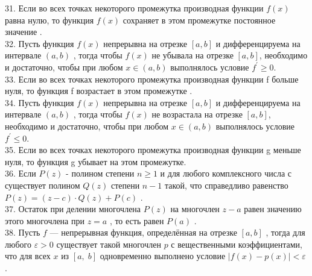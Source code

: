 \documentclass[12pt]{article}
\begin{document}
31. Если во всех точках некоторого промежутка производная функции ${\displaystyle f(x)}$ равна нулю, то функция ${\displaystyle f(x)}$ сохраняет в этом промежутке постоянное значение .\\

32. Пусть функция ${\displaystyle f(x)}$ непрерывна на отрезке  ${\displaystyle [a,b]}$ и дифференцируема на интервале ${\displaystyle (a,b)}$ ,  тогда чтобы ${\displaystyle f(x)}$ не убывала на отрезке ${\displaystyle [a,b]}$, необходимо и достаточно, чтобы при любом ${\displaystyle x \in (a,b)}$ выполнялось условие ${\displaystyle f^{\prime} \geq 0}$.\\

33. Если во всех точках некоторого промежутка производная функции f больше нуля, то функция f возрастает в этом промежутке .\\

34. Пусть функция ${\displaystyle f(x)}$ непрерывна на отрезке  ${\displaystyle [a,b]}$ и дифференцируема на интервале ${\displaystyle (a,b)}$ ,  тогда чтобы ${\displaystyle f(x)}$ не возрастала на отрезке ${\displaystyle [a,b]}$, необходимо и достаточно, чтобы при любом ${\displaystyle x \in (a,b)}$ выполнялось условие ${\displaystyle f^{\prime} \leq 0}$.\\

35. Если во всех точках некоторого промежутка производная функции g меньше нуля, то функция g убывает на этом промежутке.\\

36. Если ${\displaystyle P(z)}$ - полином степени ${\displaystyle n \geq 1}$ и для любого комплексного числа ${\displaystyle с}$ существует полином ${\displaystyle Q(z)}$ степени ${\displaystyle n-1}$ такой, что справедливо равенство ${\displaystyle P(z)=(z-c)\cdot Q(z)+P(c)}$ .\\

37. Остаток при делении многочлена ${\displaystyle P(z)}$ на многочлен ${\displaystyle z-a}$ равен значению этого многочлена при ${\displaystyle z=a}$ , то есть равен ${\displaystyle P(a)}$ .\\

38. Пусть ${\displaystyle f}$ — непрерывная функция, определённая на отрезке ${\displaystyle [a,b]}$ , тогда для любого ${\displaystyle \varepsilon >0}$ существует такой многочлен ${\displaystyle p}$  с вещественными коэффициентами, что для всех ${\displaystyle x}$  из ${\displaystyle [a,\;b]}$ одновременно выполнено условие ${\displaystyle |f(x)-p(x)|<\varepsilon }$ .\\
\end{document}

